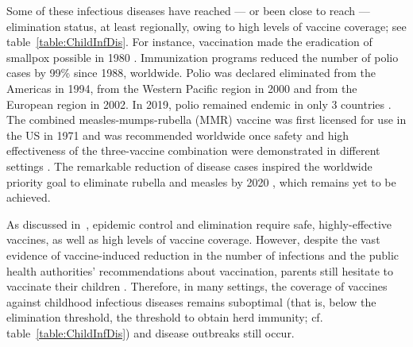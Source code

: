 Some of these infectious diseases have reached --- or been close to reach --- elimination status, at least regionally, owing to high levels of vaccine coverage; see table~\ref{table:ChildInfDis}. For instance, vaccination made the eradication of smallpox possible in 1980 \cite[]{WHO_SmallpoxEradication1980,CDC_Smallpox2001}. Immunization programs reduced the number of polio cases by 99\% since 1988, worldwide. Polio was declared eliminated from the Americas in 1994, from the Western Pacific region in 2000 and from the European region in 2002. In 2019, polio remained endemic in only 3 countries \cite[]{WHO_Factsheet_Polio}. The combined measles-mumps-rubella (MMR) vaccine was first licensed for use in the US in 1971 and was recommended worldwide once safety and high effectiveness of the three-vaccine combination were demonstrated in different settings \cite[]{Strebel2013}. The remarkable reduction of disease cases inspired the worldwide priority goal to eliminate rubella and measles by 2020 \cite[]{Andrus2011,WHO_MR2012}, which remains yet to be achieved.

As discussed in~, epidemic control and elimination require safe, highly-effective vaccines, as well as high levels of vaccine coverage. However, despite the vast evidence of vaccine-induced reduction in the number of infections and the public health authorities' recommendations about vaccination, parents still hesitate to vaccinate their children \cite[]{Larson2016}. Therefore, in many settings, the coverage of vaccines against childhood infectious diseases remains suboptimal (that is, below the elimination threshold, the threshold to obtain herd immunity; cf. table~\ref{table:ChildInfDis}) and disease outbreaks still occur.

